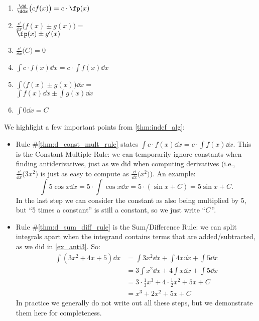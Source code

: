\begin{theorem}\label{thm:indef_alg}%
\mbox{}\\[-2.5\baselineskip]
\parbox[t]{\linewidth}{\begin{multicols}{2}
\begin{enumerate}
\item\label{thm:d_const_mult_rule} $\frac{\dd}{\dd x}\bigl(cf(x) \bigr) = c\cdot \fp(x)$
\item\label{thm:d_sum_diff_rule} $\frac{\dd}{\dd x}\bigl(f(x)\pm g(x) \bigr) =$ \\
\null\qquad$\fp(x)\pm g'(x)$
\item $\frac{\dd}{\dd x}\bigl(C \bigr) = 0$
\setcounter{enumi}{0}
\item $\int c\cdot f(x)\dd x = c\cdot \int f(x)\dd x$
\item $\int \bigl(f(x)\pm g(x)\bigr)\dd x =$ \\
\null\qquad$\int f(x)\dd x\pm \int g(x)\dd x$
\item $\int 0\dd x = C$
\end{enumerate}
\end{multicols}}
\end{theorem}

We highlight a few important points from \autoref{thm:indef_alg}:
\begin{itemize}
	\item	Rule \#\ref{thm:d_const_mult_rule} states $\int c\cdot f(x)\dd x = c\cdot \int f(x)\dd x$. This is the Constant Multiple Rule: we can temporarily ignore constants when finding antiderivatives, just as we did when computing derivatives (i.e., $\frac{\dd}{\dd x}\bigl(3x^2\bigr)$ is just as easy to compute as $\frac{\dd}{\dd x}\bigl(x^2\bigr)$). An example:
	\[\int 5\cos x\dd x = 5\cdot\int \cos x\dd x = 5\cdot (\sin x+C) = 5\sin x + C.\]
	In the last step we can consider the constant as also being multiplied by 5, but ``5 times a constant'' is still a constant, so we just write ``$C$\,''.
	\item	Rule \#\ref{thm:d_sum_diff_rule} is the Sum/Difference Rule: we can split integrals apart when the integrand contains terms that are added/subtracted, as we did in \autoref{ex_anti3}. So:
	\begin{align*}
		\int(3x^2+4x+5)\dd x
		&= \int 3x^2\dd x + \int 4x\dd x + \int 5\dd x \\
		&= 3\int x^2\dd x + 4\int x\dd x + \int 5\dd x\\
		&= 3\cdot \frac13x^3 + 4\cdot \frac12x^2+5x+C\\
		&= x^3+2x^2+5x+C
	\end{align*}
	In practice we generally do not write out all these steps, but we demonstrate them here for completeness.
\end{itemize}

